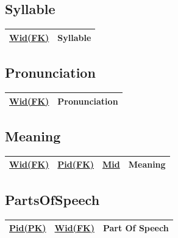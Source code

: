 \documentclass{article}
\begin{document}
\subsection*{Syllable}
{\selectfont

\begin{center}
\begin{tabular}{ |c|c| } 
 \hline
\large\underline{{Wid(FK)}} & \large{Syllable}\\  
 \hline
\end{tabular}
\end{center}
}

\subsection*{Pronunciation}
{\selectfont

\begin{center}
\begin{tabular}{ |c|c| } 
 \hline
\large\underline{{Wid(FK)}} & \large{Pronunciation}\\  
 \hline
\end{tabular}
\end{center}
}

\subsection*{Meaning}
{\selectfont

\begin{center}
\begin{tabular}{ |c|c|c|c| } 
 \hline
\large\underline{{Wid(FK)}} & \large\underline{{Pid(FK)}} & \large\underline{{Mid}} &\large{Meaning}\\  
 \hline
\end{tabular}
\end{center}
}

\subsection*{PartsOfSpeech}
{\selectfont

\begin{center}
\begin{tabular}{ |c|c|c| } 
 \hline
\large\underline{{Pid(PK)}} & \large\underline{{Wid(FK)}} & \large{Part Of Speech}\\  
 \hline
\end{tabular}
\end{center}
}
\end{document}
